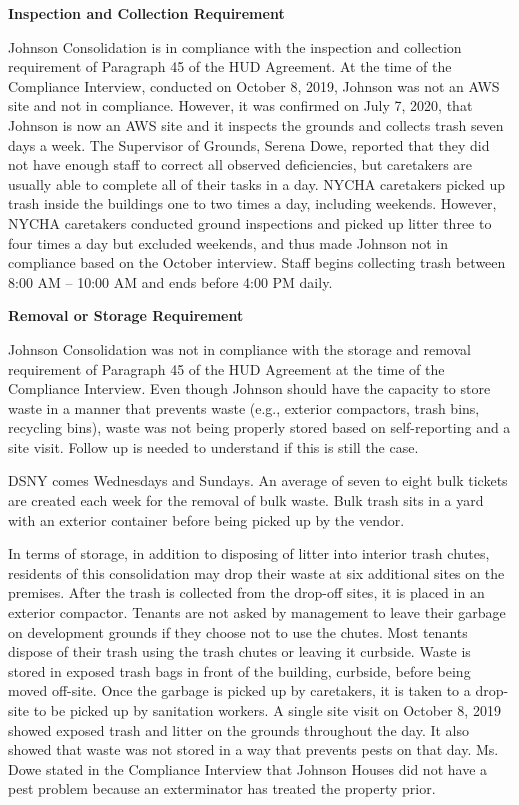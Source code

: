 

\textbf{Inspection and Collection Requirement}

Johnson Consolidation is in compliance with the inspection and collection requirement of Paragraph 45 of the HUD Agreement. At the time of the Compliance Interview, conducted on October 8, 2019, Johnson was not an AWS site and not in compliance. However, it was confirmed on July 7, 2020, that Johnson is now an AWS site and it inspects the grounds and collects trash seven days a week. The Supervisor of Grounds, Serena Dowe, reported that they did not have enough staff to correct all observed deficiencies, but caretakers are usually able to complete all of their tasks in a day. NYCHA caretakers picked up trash inside the buildings one to two times a day, including weekends. However, NYCHA caretakers conducted ground inspections and picked up litter three to four times a day but excluded weekends, and thus made Johnson not in compliance based on the October interview. Staff begins collecting trash between 8:00 AM -- 10:00 AM and ends before 4:00 PM daily.

\textbf{Removal or Storage Requirement}

Johnson Consolidation was not in compliance with the storage and removal requirement of Paragraph 45 of the HUD Agreement at the time of the Compliance Interview. Even though Johnson should have the capacity to store waste in a manner that prevents waste (e.g., exterior compactors, trash bins, recycling bins), waste was not being properly stored based on self-reporting and a site visit. Follow up is needed to understand if this is still the case. 

DSNY comes Wednesdays and Sundays. An average of seven to eight bulk tickets are created each week for the removal of bulk waste. Bulk trash sits in a yard with an exterior container before being picked up by the vendor.

In terms of storage, in addition to disposing of litter into interior trash chutes, residents of this consolidation may drop their waste at six additional sites on the premises. After the trash is collected from the drop-off sites, it is placed in an exterior compactor. Tenants are not asked by management to leave their garbage on development grounds if they choose not to use the chutes. Most tenants dispose of their trash using the trash chutes or leaving it curbside. Waste is stored in exposed trash bags in front of the building, curbside, before being moved off-site. Once the garbage is picked up by caretakers, it is taken to a drop-site to be picked up by sanitation workers. A single site visit on October 8, 2019 showed exposed trash and litter on the grounds throughout the day. It also showed that waste was not stored in a way that prevents pests on that day. Ms. Dowe stated in the Compliance Interview that Johnson Houses did not have a pest problem because an exterminator has treated the property prior.

